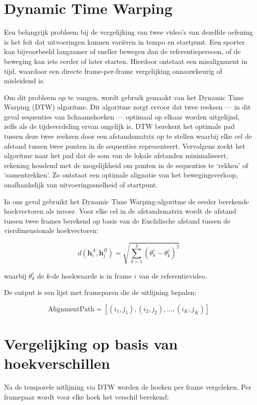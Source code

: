\section{Dynamic Time Warping}
Een belangrijk probleem bij de vergelijking van twee video’s van dezelfde oefening is het feit dat uitvoeringen kunnen variëren in tempo en startpunt. 
Een sporter kan bijvoorbeeld langzamer of sneller bewegen dan de referentiepersoon, of de beweging kan iets eerder of later starten. 
Hierdoor ontstaat een misalignment in tijd, waardoor een directe frame-per-frame vergelijking onnauwkeurig of misleidend is.

\medskip

Om dit probleem op te vangen, wordt gebruik gemaakt van het Dynamic Time Warping (DTW) algoritme. 
Dit algoritme zorgt ervoor dat twee reeksen — in dit geval sequenties van lichaamshoeken — optimaal op elkaar worden uitgelijnd, zelfs als de tijdsverdeling ervan ongelijk is. 
DTW berekent het optimale pad tussen deze twee reeksen door een afstandsmatrix op te stellen waarbij elke cel de afstand tussen twee punten in de sequenties representeert. 
Vervolgens zoekt het algoritme naar het pad dat de som van de lokale afstanden minimaliseert, rekening houdend met de mogelijkheid om punten in de sequenties te ‘rekken’ of ‘samentrekken’. 
Zo ontstaat een optimale alignatie van het bewegingsverloop, onafhankelijk van uitvoeringssnelheid of startpunt.

\medskip

In ons geval gebruikt het Dynamic Time Warping-algoritme de eerder berekende hoekvectoren als invoer. Voor elke cel in de afstandsmatrix wordt de afstand tussen twee frames berekend op basis van de Euclidische afstand tussen de vierdimensionale hoekvectoren:

\[
d(\mathbf{h}_i^A, \mathbf{h}_j^B) = \sqrt{\sum_{k=1}^{4} (\theta_k^i - \theta_k^j)^2}
\]

waarbij $\theta_k^i$ de $k$-de hoekwaarde is in frame $i$ van de referentievideo.

De output is een lijst met frameparen die de uitlijning bepalen:

\[
\text{AlignmentPath} = \left[ (i_1, j_1), (i_2, j_2), \dots, (i_K, j_K) \right]
\]

\section{Vergelijking op basis van hoekverschillen}
Na de temporele uitlijning via DTW worden de hoeken per frame vergeleken. Per framepaar wordt voor elke hoek het verschil berekend:

